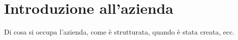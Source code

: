 \section{Introduzione all'azienda}
\label{sez:introduzione-azienda}

Di cosa si occupa l'azienda, come è strutturata, quando è stata creata, ecc.\\